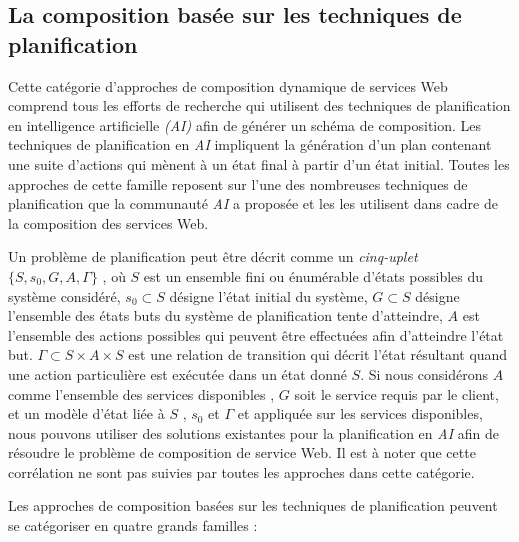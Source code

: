   \subsection{La composition basée sur les techniques de
    planification}
  \label{sec:tech-de-plan}
  Cette catégorie d'approches de composition dynamique de services Web
  comprend tous les efforts de recherche qui utilisent des techniques
  de planification en intelligence artificielle \textit{(AI)} afin de
  générer un schéma de composition. Les techniques de planification en
  \textit{AI} impliquent la génération d'un plan contenant une suite
  d'actions qui mènent à un état final à partir d'un état
  initial. Toutes les approches de cette famille reposent sur l'une
  des nombreuses techniques de planification que la communauté
  \textit{AI} a proposée et les les utilisent dans cadre de la
  composition des services Web.\medskip

  Un problème de planification peut être décrit comme un
  \textit{cinq-uplet} \textit{$\{S, s_0,G, A, \Gamma\}$}
  \cite{carman2003web}, où $S$ est un ensemble fini ou énumérable
  d'états possibles du système considéré, $s_0\subset S$ désigne
  l'état initial du système, $G\subset S$ désigne l'ensemble des états
  buts du système de planification tente d'atteindre, $A$ est
  l'ensemble des actions possibles qui peuvent être effectuées afin
  d'atteindre l'état but.  \textit{$\Gamma \subset S \times A \times
    S$} est une relation de transition qui décrit l'état résultant
  quand une action particulière est exécutée dans un état donné
  $S$. Si nous considérons $A$ comme l'ensemble des services
  disponibles , $G$ soit le service requis par le client, et un modèle
  d'état liée à $S$ , $s_0$ et $\Gamma$ et appliquée sur les services
  disponibles, nous pouvons utiliser des solutions existantes pour la
  planification en \textit{AI} afin de résoudre le problème de
  composition de service Web. Il est à noter que cette corrélation ne
  sont pas suivies par toutes les approches dans cette
  catégorie.\medskip

  Les approches de composition basées sur les techniques de
  planification peuvent se catégoriser en quatre grands familles
  \cite{baryannis2010}:

